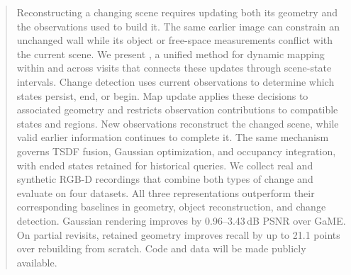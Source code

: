 \begin{abstract}
Reconstructing a changing scene requires updating both its geometry and the observations used to build it.
The same earlier image can constrain an unchanged wall while its object or free-space measurements conflict
with the current scene. We present \ours, a unified method for dynamic mapping within and across visits
that connects these updates through scene-state intervals. Change detection uses current observations to
determine which states persist, end, or begin. Map update applies these decisions to associated geometry
and restricts observation contributions to compatible states and regions. New observations reconstruct the
changed scene, while valid earlier information continues to complete it. The same mechanism governs TSDF
fusion, Gaussian optimization, and occupancy integration, with ended states retained for historical queries.
We collect real and synthetic RGB-D recordings that combine both types of change and evaluate on four
datasets. All three representations outperform their corresponding baselines in geometry, object
reconstruction, and change detection. Gaussian rendering improves by 0.96--3.43\,dB PSNR over GaME.
On partial revisits, retained geometry improves recall by up to 21.1 points over rebuilding from scratch.
Code and data will be made publicly available.
\end{abstract}
